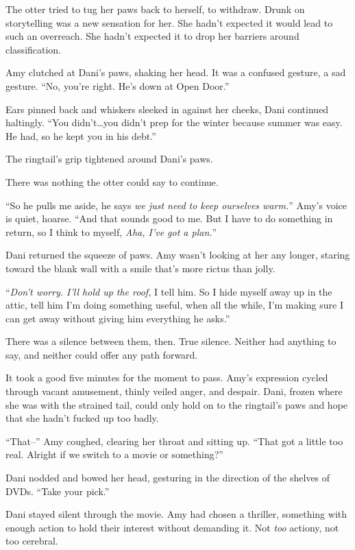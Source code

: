 The otter tried to tug her paws back to herself, to withdraw. Drunk on storytelling was a new sensation for her. She hadn't expected it would lead to such an overreach. She hadn't expected it to drop her barriers around classification.

Amy clutched at Dani's paws, shaking her head. It was a confused gesture, a sad gesture. ``No, you're right. He's down at Open Door.''

Ears pinned back and whiskers sleeked in against her cheeks, Dani continued haltingly. ``You didn't\ldots{}you didn't prep for the winter because summer was easy. He had, so he kept you in his debt.''

The ringtail's grip tightened around Dani's paws.

There was nothing the otter could say to continue.

``So he pulls me aside, he says \emph{we just need to keep ourselves warm.}'' Amy's voice is quiet, hoarse. ``And that sounds good to me. But I have to do something in return, so I think to myself, \emph{Aha, I've got a plan.}''

Dani returned the squeeze of paws. Amy wasn't looking at her any longer, staring toward the blank wall with a smile that's more rictus than jolly.

``\emph{Don't worry. I'll hold up the roof,} I tell him. So I hide myself away up in the attic, tell him I'm doing something useful, when all the while, I'm making sure I can get away without giving him everything he asks.''

There was a silence between them, then. True silence. Neither had anything to say, and neither could offer any path forward.

It took a good five minutes for the moment to pass. Amy's expression cycled through vacant amusement, thinly veiled anger, and despair. Dani, frozen where she was with the strained tail, could only hold on to the ringtail's paws and hope that she hadn't fucked up too badly.

``That--'' Amy coughed, clearing her throat and sitting up. ``That got a little too real. Alright if we switch to a movie or something?''

Dani nodded and bowed her head, gesturing in the direction of the shelves of DVDs. ``Take your pick.''

\secdiv

Dani stayed silent through the movie. Amy had chosen a thriller, something with enough action to hold their interest without demanding it. Not \emph{too} actiony, not too cerebral.

